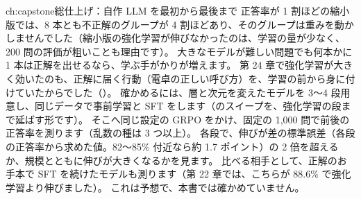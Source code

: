\begin{answers}{ch:capstone}{総仕上げ：自作 LLM を最初から最後まで}
正答率が 1 割ほどの縮小版では、8 本とも不正解のグループが 4 割ほどあり、そのグループは重みを動かしませんでした（縮小版の強化学習が伸びなかったのは、学習の量が少なく、200 問の評価が粗いことも理由です）。
大きなモデルが難しい問題でも何本かに 1 本は正解を出せるなら、学ぶ手がかりが増えます。
第 24 章で強化学習が大きく効いたのも、正解に届く行動（電卓の正しい呼び方）を、学習の前から身に付けていたからでした（）。
確かめるには、層と次元を変えたモデルを 3〜4 段用意し、同じデータで事前学習と SFT をします（のスイープを、強化学習の段まで延ばす形です）。
そこへ同じ設定の GRPO をかけ、固定の 1,000 問で前後の正答率を測ります（乱数の種は 3 つ以上）。
各段で、伸びが差の標準誤差（各段の正答率から求めた値。82〜85\% 付近なら約 1.7 ポイント）の 2 倍を超えるか、規模とともに伸びが大きくなるかを見ます。
比べる相手として、正解のお手本で SFT を続けたモデルも測ります（第 22 章では、こちらが 88.6\% で強化学習より伸びました）。
これは予想で、本書では確かめていません。
\end{answers}
